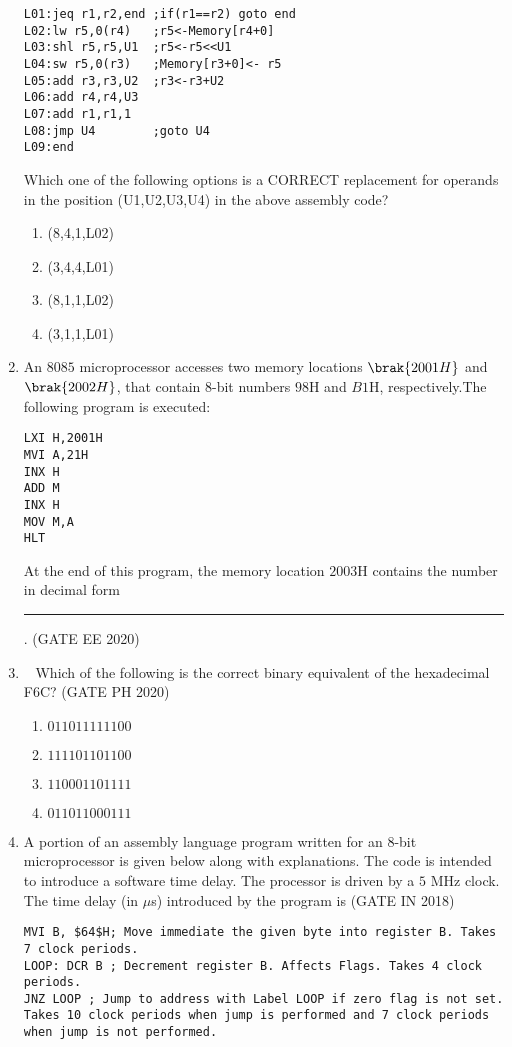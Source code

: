 \begin{enumerate}[label=\arabic*.,ref=\theenumi]
\begin{lstlisting}
L01:jeq r1,r2,end ;if(r1==r2) goto end
L02:lw r5,0(r4)   ;r5<-Memory[r4+0]
L03:shl r5,r5,U1  ;r5<-r5<<U1
L04:sw r5,0(r3)   ;Memory[r3+0]<- r5
L05:add r3,r3,U2  ;r3<-r3+U2
L06:add r4,r4,U3
L07:add r1,r1,1
L08:jmp U4        ;goto U4
L09:end
\end{lstlisting}
Which one of the following options is a CORRECT replacement 
for operands in the position (U1,U2,U3,U4) in the above 
assembly code?
%
\begin{enumerate}
\item (8,4,1,L02)                      
\item (3,4,4,L01)
\item (8,1,1,L02)                             
\item (3,1,1,L01)         
\end{enumerate}
\item An $8085$ microprocessor accesses two memory locations $\brak{2001H}$ and $\brak{2002H}$, that contain $8$-bit numbers $98$H and $B1$H, respectively.The following program is executed:
\begin{verbatim}LXI H,2001H
MVI A,21H
INX H
ADD M
INX H
MOV M,A
HLT
\end{verbatim}
		At the end of this program, the memory location $2003$H contains the number in decimal form \rule{1cm}{0.1pt}.
		\hfill (GATE EE 2020)
\item  Which of the following is the correct binary equivalent of the hexadecimal F6C?
	\hfill (GATE PH 2020)
%
\begin{enumerate}
  \item  $0110 1111 1100$
  \item $1111 0110 1100$
  \item $1100 0110 1111$
  \item $0110 1100 0111$
\end{enumerate}
\item
\label{prob:gate IN 45}
 A portion of an assembly language program written for an $8$-bit microprocessor is given below along with explanations. The code is intended to introduce a software time delay. The processor is driven by a $5$ MHz clock. The time delay (in $\mu$s) introduced by the program is 
\hfill(GATE IN 2018)
\begin{lstlisting}
MVI B, $64$H; Move immediate the given byte into register B. Takes 7 clock periods.
LOOP: DCR B ; Decrement register B. Affects Flags. Takes 4 clock periods. 
JNZ LOOP ; Jump to address with Label LOOP if zero flag is not set. Takes 10 clock periods when jump is performed and 7 clock periods when jump is not performed.

\end{lstlisting}
\end{enumerate}
